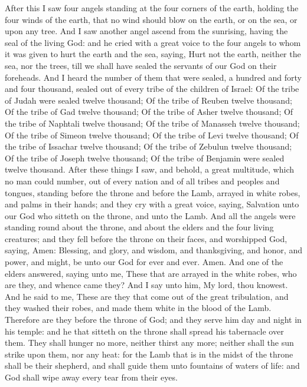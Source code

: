 After this I saw four angels standing at the four corners of the earth, holding the four winds of the earth, that no wind should blow on the earth, or on the sea, or upon any tree. And I saw another angel ascend from the sunrising, having the seal of the living God: and he cried with a great voice to the four angels to whom it was given to hurt the earth and the sea, saying, Hurt not the earth, neither the sea, nor the trees, till we shall have sealed the servants of our God on their foreheads. And I heard the number of them that were sealed, a hundred and forty and four thousand, sealed out of every tribe of the children of Israel:  Of the tribe of Judah were sealed twelve thousand; Of the tribe of Reuben twelve thousand; Of the tribe of Gad twelve thousand;  Of the tribe of Asher twelve thousand; Of the tribe of Naphtali twelve thousand; Of the tribe of Manasseh twelve thousand;  Of the tribe of Simeon twelve thousand; Of the tribe of Levi twelve thousand; Of the tribe of Issachar twelve thousand;  Of the tribe of Zebulun twelve thousand; Of the tribe of Joseph twelve thousand; Of the tribe of Benjamin were sealed twelve thousand.  After these things I saw, and behold, a great multitude, which no man could number, out of every nation and of all tribes and peoples and tongues, standing before the throne and before the Lamb, arrayed in white robes, and palms in their hands; and they cry with a great voice, saying, Salvation unto our God who sitteth on the throne, and unto the Lamb.  And all the angels were standing round about the throne, and about the elders and the four living creatures; and they fell before the throne on their faces, and worshipped God, saying, Amen: Blessing, and glory, and wisdom, and thanksgiving, and honor, and power, and might, be unto our God for ever and ever. Amen.  And one of the elders answered, saying unto me, These that are arrayed in the white robes, who are they, and whence came they? And I say unto him, My lord, thou knowest. And he said to me, These are they that come out of the great tribulation, and they washed their robes, and made them white in the blood of the Lamb. Therefore are they before the throne of God; and they serve him day and night in his temple: and he that sitteth on the throne shall spread his tabernacle over them. They shall hunger no more, neither thirst any more; neither shall the sun strike upon them, nor any heat: for the Lamb that is in the midst of the throne shall be their shepherd, and shall guide them unto fountains of waters of life: and God shall wipe away every tear from their eyes. 

